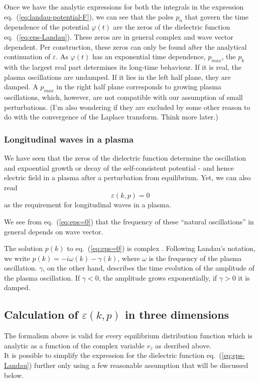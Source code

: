 \documentclass[physics,phd,nolot,nolof]{uccthesis}%
\begin{document}
Once we have the analytic expressions for both the integrals in the expression eq.~(\ref{eq:landau-potential-F}), we can see that the poles $p_n$ that govern the time dependence of the potential $\varphi(t)$ are the zeros of the dielectric function eq.~(\ref{eq:eps-Landau}). These zeros are in general complex and wave vector dependent. 
Per construction, these zeros can only be found after the analytical continuation of $\varepsilon$. 
As $\varphi(t)$ has an exponential time dependence, $p_{max}$, the $p_k$  with the largest real part determines its long-time behaviour. 
If it is real, the  plasma oscillations are undamped. 
If it lies in the left half plane, they are damped. 
A $p_{max}$ in the right half plane corresponds to growing plasma oscillations, which, however, are not compatible with our assumption of small perturbations.
(I'm  also wondering if they are excluded by some other reason to do with the convergence of the Laplace transform. Think more later.)

\subsubsection{Longitudinal waves in a plasma}
We have seen that the zeros of the dielectric function 
determine the oscillation and expoential growth or decay of the self-consistent potential - and hence electric field in a plasma after a perturbation from equilibrium. 
Yet, we can also read
\begin{equation}
	\varepsilon(k,p)=0
	\label{eq:eps=0}
\end{equation}
as the requirement for longitudinal waves in a plasma. 

We see from eq.~(\ref{eq:eps=0}) that the frequency of these ``natural oscillations'' in general depends on wave vector.

The solution $p(k)$ to eq.~(\ref{eq:eps=0}) is complex . 
Following Landau's notation, we write
$p(k)=-i\omega(k)-\gamma(k)$, 
where $\omega$ is the frequency of the plasma oscillation.
$\gamma$, on the other hand, describes the time evolution of the amplitude of the plasma oscillation. 
If $\gamma <0$, the amplitude grows exponentially, 
if $\gamma>0$  it is damped.

\subsection{Calculation of $\varepsilon(k,p)$ in three dimensions}
The formalism above is valid for every equilibrium distribution function which is analytic as a function of the complex variable $v_z$ as desribed above. \\
It is possible to simplify the expression for the dielectric function eq.~(\ref{eq:eps-Landau}) further only using a few reasonable assumption that will be discussed below. 
\end{document}
